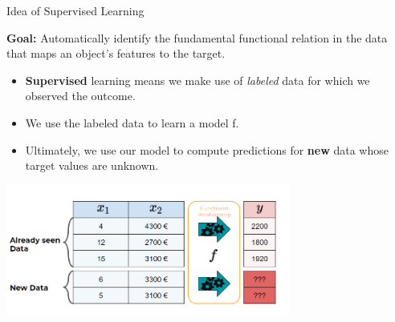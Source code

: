 	
\begin{vbframe}{Idea of Supervised Learning}


\textbf{Goal:} Automatically identify the fundamental functional relation in the data 
  that maps an object's features to the target.

\begin{itemize}

  \item \textbf{Supervised} learning means we make use of \emph{labeled}
  data for which we observed the outcome.
  

  \item We use the labeled data to learn a model f.

  \item Ultimately, we use our model to compute predictions for 
  \textbf{new} data whose target values are unknown.
  
\end{itemize}

\begin{center}
  \includegraphics[width=0.7\textwidth]{figure_man/what_is_a_model_web} 
\end{center}
\end{vbframe}

\framebreak 



  
  
  
